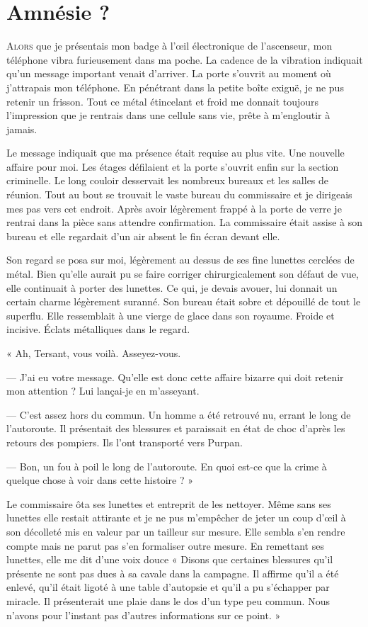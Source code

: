 \chapter{Amnésie ?}

\lettrine{A}{lors} que je présentais mon badge à l'œil électronique de l'ascenseur, mon téléphone vibra furieusement 
dans ma poche.
La cadence de la vibration indiquait qu'un message important venait d'arriver. La porte s'ouvrit au moment où
j'attrapais mon téléphone. En pénétrant dans la petite boîte exiguë, je ne pus retenir un frisson. Tout ce métal
étincelant et froid me donnait toujours l'impression que je rentrais dans une cellule sans vie, prête à m'engloutir à
jamais. 

Le message indiquait que ma présence était requise au plus vite. Une nouvelle affaire pour moi. Les étages défilaient 
et la porte s'ouvrit enfin sur la section criminelle. Le long couloir desservait les nombreux bureaux et les salles de 
réunion. Tout au bout se trouvait le vaste bureau du commissaire et je dirigeais mes pas vers cet endroit. Après avoir 
légèrement frappé à la porte de verre je rentrai dans la pièce sans attendre confirmation. La commissaire était assise à 
son bureau et elle regardait d'un air absent le fin écran devant elle.

Son regard se posa sur moi, légèrement au dessus de ses fine lunettes cerclées de métal. Bien qu'elle aurait pu se faire
corriger chirurgicalement son défaut de vue, elle continuait à porter des lunettes. Ce qui, je devais avouer, lui 
donnait un certain charme légèrement suranné. Son bureau était sobre et dépouillé de tout le superflu. Elle ressemblait 
à une vierge de glace dans son royaume. Froide et incisive. Éclats métalliques dans le regard.

« Ah, Tersant, vous voilà. Asseyez-vous.

— J'ai eu votre message. Qu'elle est donc cette affaire bizarre qui doit retenir mon attention ? Lui lançai-je en
m'asseyant.

— C'est assez hors du commun. Un homme a été retrouvé nu, errant le long de l'autoroute. Il présentait des blessures et
paraissait en état de choc d'après les retours des pompiers. Ils l'ont transporté vers Purpan.

— Bon, un fou à poil le long de l'autoroute. En quoi est-ce que la crime à quelque chose à voir dans cette histoire ? »

Le commissaire ôta ses lunettes et entreprit de les nettoyer. Même sans ses lunettes elle restait attirante et je ne pus
m'empêcher de jeter un coup d'œil à son décolleté mis en valeur par un tailleur sur mesure. Elle sembla s'en rendre
compte mais ne parut pas s'en formaliser outre mesure. En remettant ses lunettes, elle me dit d'une voix douce « 
Disons que certaines blessures qu'il présente ne sont pas dues à sa cavale dans la campagne. Il affirme qu'il a été 
enlevé, qu'il était ligoté à une table d'autopsie et qu'il a pu s'échapper par miracle. Il présenterait une plaie dans 
le dos d'un type peu commun. Nous n'avons pour l'instant pas d'autres informations sur ce point. »

